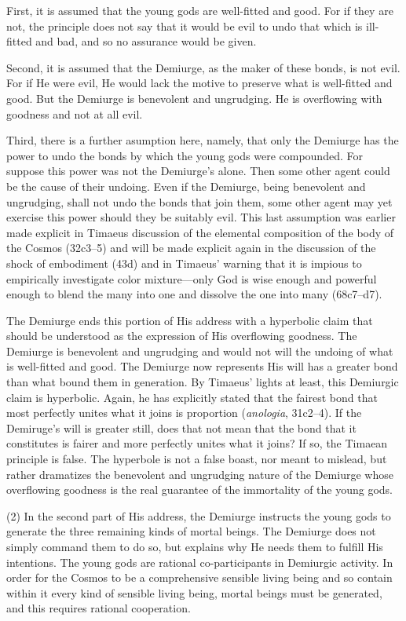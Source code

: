 First, it is assumed that the young gods are well-fitted and good. For if they are not, the principle does not say that it would be evil to undo that which is ill-fitted and bad, and so no assurance would be given. 

Second, it is assumed that the Demiurge, as the maker of these bonds, is not evil. For if He were evil, He would lack the motive to preserve what is well-fitted and good. But the Demiurge is benevolent and ungrudging. He is overflowing with goodness and not at all evil. 

Third, there is a further asumption here, namely, that only the Demiurge has the power to undo the bonds by which the young gods were compounded. For suppose this power was not the Demiurge's alone. Then some other agent could be the cause of their undoing. Even if the Demiurge, being benevolent and ungrudging, shall not undo the bonds that join them, some other agent may yet exercise this power should they be suitably evil. This last assumption was earlier made explicit in Timaeus discussion of the elemental composition of the body of the Cosmos (32c3--5) and will be made explicit again in the discussion of the shock of embodiment (43d) and in Timaeus' warning that it is impious to empirically investigate color mixture---only God is wise enough and powerful enough to blend the many into one and dissolve the one into many (68c7–d7).

The Demiurge ends this portion of His address with a hyperbolic claim that should be understood as the expression of His overflowing goodness. The Demiurge is benevolent and ungrudging and would not will the undoing of what is well-fitted and good. The Demiurge now represents His will has a greater bond than what bound them in generation. By Timaeus' lights at least, this Demiurgic claim is hyperbolic. Again, he has explicitly stated that the fairest bond that most perfectly unites what it joins is proportion (\emph{anologia}, 31c2--4). If the Demiruge's will is greater still, does that not mean that the bond that it constitutes is fairer and more perfectly unites what it joins? If so, the Timaean principle is false. The hyperbole is not a false boast, nor meant to mislead, but rather dramatizes the benevolent and ungrudging nature of the Demiurge whose overflowing goodness is the real guarantee of the immortality of the young gods. 

(2) In the second part of His address, the Demiurge instructs the young gods to generate the three remaining kinds of mortal beings. The Demiurge does not simply command them to do so, but explains why He needs them to fulfill His intentions. The young gods are rational co-participants in Demiurgic activity. In order for the Cosmos to be a comprehensive sensible living being and so contain within it every kind of sensible living being, mortal beings must be generated, and this requires rational cooperation.

